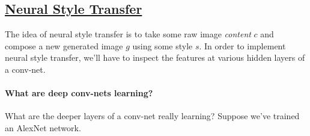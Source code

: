 \documentclass[12pt]{article}
\begin{document}
\subsection{\href{https://arxiv.org/abs/1508.06576}{Neural Style Transfer}} The idea of neural style transfer is to take some raw image \emph{content} $c$ and compose a new generated image $g$ using some style $s$. In order to implement neural style transfer, we'll have to inspect the features at various hidden layers of a conv-net.
\paragraph{What are deep conv-nets learning?} What are the deeper layers of a conv-net really learning? Suppose we've trained an AlexNet network.
\begin{figure}[h]
\end{figure}
\end{document}
